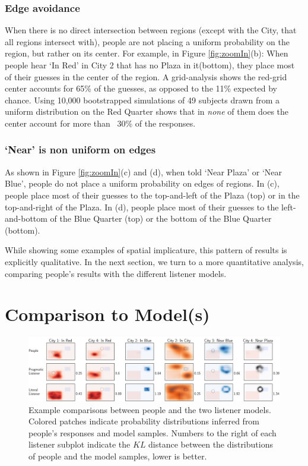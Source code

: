 \documentclass[10pt,letterpaper]{article}
\begin{document}
\subsubsection{Edge avoidance} When there is no direct intersection between regions (except with the City, that all regions intersect with), people are not placing a uniform probability on the region, but rather on its center. For example, in Figure \ref{fig:zoomIn}(b): When people hear `In Red' in City 2 that has no Plaza in it(bottom), they place most of their guesses in the center of the region. A grid-analysis shows the red-grid center accounts for 65\% of the guesses, as opposed to the 11\% expected by chance. Using 10,000 bootstrapped simulations of 49 subjects drawn from a uniform distribution on the Red Quarter shows that in \textit{none} of them does the center account for more than ~30\% of the responses. 

\subsubsection{`Near' is non uniform on edges} As shown in Figure \ref{fig:zoomIn}(c) and (d), when told `Near Plaza' or `Near Blue', people do not place a uniform probability on edges of regions. In (c), people place most of their guesses to the top-and-left of the Plaza (top) or in the top-and-right of the Plaza. In (d), people place most of their guesses to the left-and-bottom of the Blue Quarter (top) or the bottom of the Blue Quarter (bottom). 

While showing some examples of spatial implicature, this pattern of results is explicitly qualitative. In the next section, we turn to a more quantitative analysis, comparing people's results with the different listener models. 

\section{Comparison to Model(s)}

\begin{figure}[!t]
\center
\includegraphics[width=\textwidth]{figures/Figure4.pdf}
\caption{Example comparisons between people and the two listener models. Colored patches indicate probability distributions inferred from people's responses and model samples. Numbers to the right of each listener subplot indicate the $KL$ distance between the distributions of people and the model samples, lower is better.}
\label{fig:modelExamples}
\end{figure}
\end{document}
